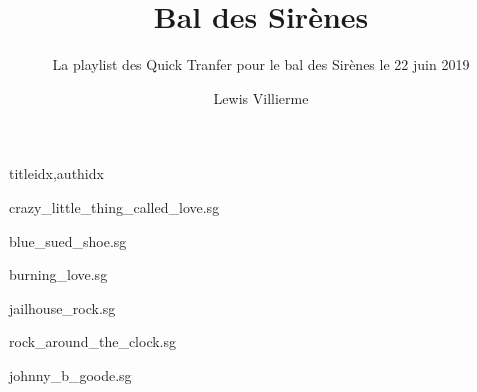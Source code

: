 \documentclass[
    ]{article}
\title{Bal des Sirènes}
\author{Lewis Villierme}
\subtitle{La playlist des Quick Tranfer pour le bal des Sirènes le 22 juin 2019}
\newcommand{\phantomsection}{}
\begin{document}
\maketitle



\ifdiagrampage
   \phantomsection
   \chords
\fi
\setcounter{songnum}{1}%

\phantomsection
{}



\begin{songs}{titleidx,authidx}

{crazy_little_thing_called_love.sg}


{blue_sued_shoe.sg}


{burning_love.sg}


{jailhouse_rock.sg}


{rock_around_the_clock.sg}


{johnny_b_goode.sg}

\end{songs}
\end{document}
